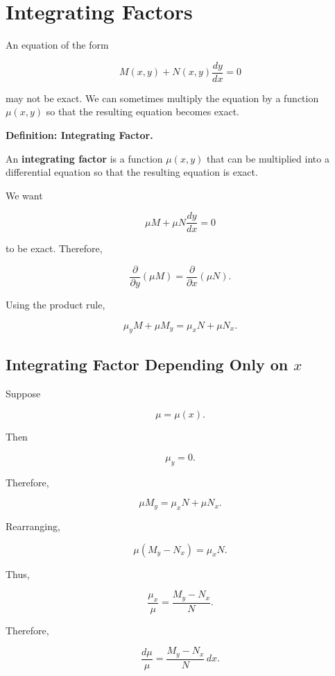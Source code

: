 \documentclass[11pt]{article}
\newenvironment{definitionbox}[1]
    {\par\medskip\noindent\textbf{Definition: #1.}\par}
    {\par\medskip}
\begin{document}
\section{Integrating Factors}

An equation of the form

\[
M(x,y)+N(x,y)\frac{dy}{dx}=0
\]

may not be exact. We can sometimes multiply the equation by a
function $\mu(x,y)$ so that the resulting equation becomes exact.

\begin{definitionbox}{Integrating Factor}

An \textbf{integrating factor} is a function $\mu(x,y)$ that can be
multiplied into a differential equation so that the resulting equation
is exact.

\end{definitionbox}

We want

\[
\mu M+\mu N\frac{dy}{dx}=0
\]

to be exact. Therefore,

\[
\frac{\partial}{\partial y}(\mu M)
=
\frac{\partial}{\partial x}(\mu N).
\]

Using the product rule,

\[
\mu_yM+\mu M_y
=
\mu_xN+\mu N_x.
\]

\subsection{Integrating Factor Depending Only on
\texorpdfstring{$x$}{x}}

Suppose

\[
\mu=\mu(x).
\]

Then

\[
\mu_y=0.
\]

Therefore,

\[
\mu M_y
=
\mu_xN+\mu N_x.
\]

Rearranging,

\[
\mu(M_y-N_x)=\mu_xN.
\]

Thus,

\[
\frac{\mu_x}{\mu}
=
\frac{M_y-N_x}{N}.
\]

Therefore,

\[
\boxed{
\frac{d\mu}{\mu}
=
\frac{M_y-N_x}{N}\,dx
}.
\]
\end{document}
